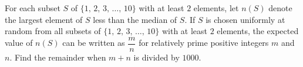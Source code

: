 For each subset $S$ of $\{1,\,2,\,3,\,\ldots,\,10\}$ with at least $2$ elements, let $n(S)$ denote the largest element of $S$ less than the median of $S$. If $S$ is chosen uniformly at random from all subsets of $\{1,\,2,\,3,\,\ldots,\,10\}$ with at least $2$ elements, the expected value of $n(S)$ can be written as $\dfrac{m}{n}$ for relatively prime positive integers $m$ and $n$. Find the remainder when $m+n$ is divided by $1000$.
